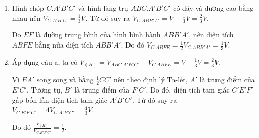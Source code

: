 \begin{enumerate}[label=(\alph*)]
    \item Hình chóp $C.A'B'C'$ và hình lăng trụ $ABC.A'B'C'$ có đáy và đường cao bằng nhau nên $V_{C.A'B'C'} = \frac{1}{3} V$. Từ đó suy ra $V_{C.ABB'A'} = V - \frac{1}{3}V = \frac{2}{3} V$.
    
    Do $EF$ là đường trung bình của hình bình hành $ABB'A'$, nên diện tích $ABFE$ bằng nửa diện tích $ABB'A'$. Do đó $V_{C.ABFE} = \frac{1}{2} V_{C.ABB'A'} = \frac{1}{3} V$.
    
    \item Áp dụng câu a, ta có $V_{(H)} = V_{ABC.A'B'C'} - V_{C.ABFE} = V - \frac{1}{3} V = \frac{2}{3} V$.
    
    Vì $EA'$ song song và bằng $\frac{1}{2} CC'$ nên theo định lý Ta-lét, $A'$ là trung điểm của $E'C'$. Tương tự, $B'$ là trung điểm của $F'C'$. Do đó, diện tích tam giác $C'E'F'$ gấp bốn lần diện tích tam giác $A'B'C'$. Từ đó suy ra $V_{C.E'F'C'} = 4 V_{C.A'B'C'} = \frac{4}{3} V$.
    
    Do đó $\frac{V_{(H)}}{V_{C.E'F'C'}} = \frac{1}{2}$.
\end{enumerate}